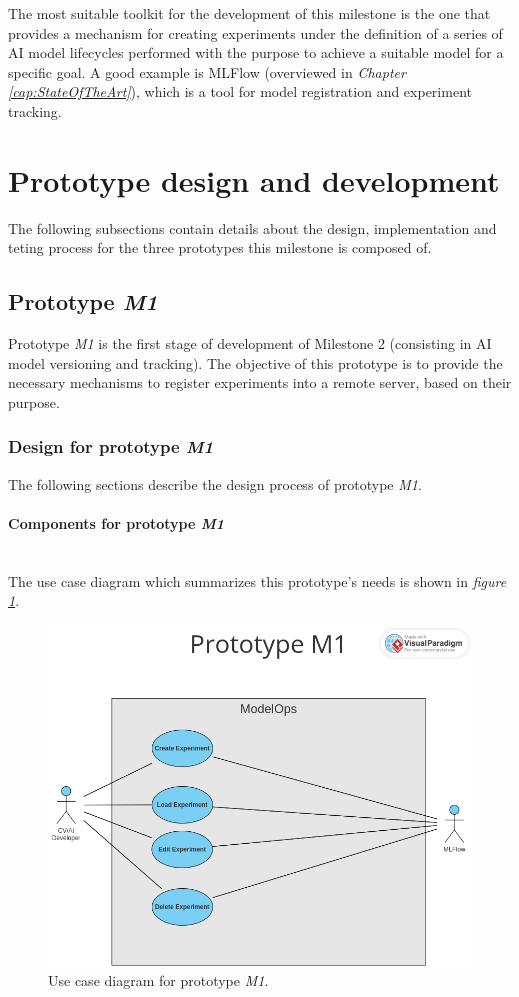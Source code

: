 The most suitable toolkit for the development of this milestone is the one that provides a mechanism for creating experiments under the 
definition of a series of \acrshort{AI} model lifecycles performed with the purpose to achieve a suitable model for a specific goal. A good example is MLFlow
(overviewed in \emph{Chapter \ref{cap:StateOfTheArt}}), which is a tool for model registration and experiment tracking.

\section{Prototype design and development}

The following subsections contain details about the design, implementation and teting process for the three prototypes this milestone is composed of.

\subsection{Prototype \emph{M1}}

Prototype \emph{M1} is the first stage of development of Milestone 2 (consisting in \acrshort{AI} model versioning and tracking). The objective of this prototype is to provide 
the necessary mechanisms to register experiments into a remote server, based on their purpose.

\subsubsection{Design for prototype \emph{M1}}

The following sections describe the design process of prototype \emph{M1}.

\paragraph{Components for prototype \emph{M1}} \mbox{}\\

The use case diagram which summarizes this prototype's needs is shown in \emph{figure \ref{fig:useCaseM1}}.

\begin{figure}[H]
    \centering
    \includegraphics[width=0.7\linewidth]{figs/use-case-M1.png}
    \caption{Use case diagram for prototype \emph{M1}.}
    \label{fig:useCaseM1}
\end{figure}

